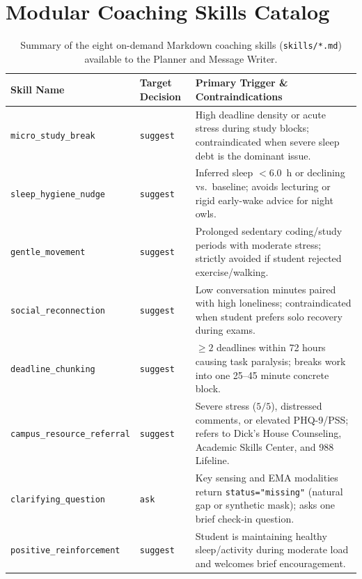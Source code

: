 \documentclass{article}
\begin{document}
\clearpage
\section{Modular Coaching Skills Catalog}
\label{app:skills}

\begin{table}[H]
  \caption{Summary of the eight on-demand Markdown coaching skills (\texttt{skills/*.md}) available to the Planner and Message Writer.}
  \label{tab:skills-catalog}
  \vskip 0.1in
  \begin{center}
    \begin{small}
      \begin{tabular}{llp{8.2cm}}
        \toprule
        Skill Name                          & Target Decision  & Primary Trigger \& Contraindications                                                                                                            \\
        \midrule
        \texttt{micro\_study\_break}        & \texttt{suggest} & High deadline density or acute stress during study blocks; contraindicated when severe sleep debt is the dominant issue.                        \\
        \texttt{sleep\_hygiene\_nudge}      & \texttt{suggest} & Inferred sleep $<6.0$~h or declining vs.\ baseline; avoids lecturing or rigid early-wake advice for night owls.                                 \\
        \texttt{gentle\_movement}           & \texttt{suggest} & Prolonged sedentary coding/study periods with moderate stress; strictly avoided if student rejected exercise/walking.                           \\
        \texttt{social\_reconnection}       & \texttt{suggest} & Low conversation minutes paired with high loneliness; contraindicated when student prefers solo recovery during exams.                          \\
        \texttt{deadline\_chunking}         & \texttt{suggest} & $\ge 2$ deadlines within 72 hours causing task paralysis; breaks work into one 25--45 minute concrete block.                                    \\
        \texttt{campus\_resource\_referral} & \texttt{suggest} & Severe stress ($5/5$), distressed comments, or elevated PHQ-9/PSS; refers to Dick's House Counseling, Academic Skills Center, and 988 Lifeline. \\
        \texttt{clarifying\_question}       & \texttt{ask}     & Key sensing and EMA modalities return \texttt{status="missing"} (natural gap or synthetic mask); asks one brief check-in question.              \\
        \texttt{positive\_reinforcement}    & \texttt{suggest} & Student is maintaining healthy sleep/activity during moderate load and welcomes brief encouragement.                                            \\
        \bottomrule
      \end{tabular}
    \end{small}
  \end{center}
\end{table}
\end{document}
